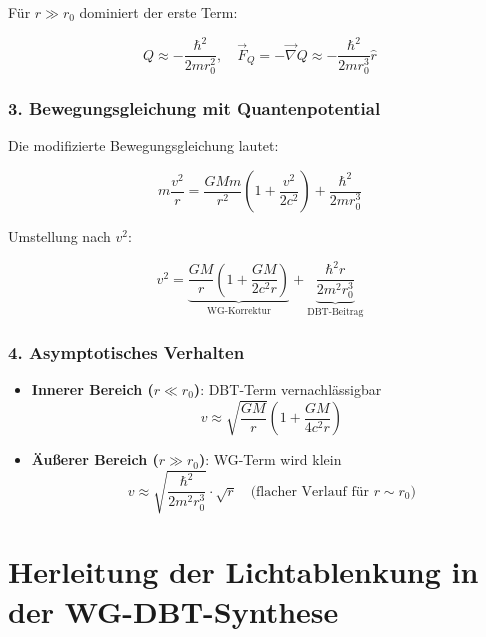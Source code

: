 Für $r \gg r_0$ dominiert der erste Term:

\begin{equation}
Q \approx -\frac{\hbar^2}{2m r_0^2}, \quad \vec{F}_Q = -\vec{\nabla}Q \approx -\frac{\hbar^2}{2m r_0^3}\hat{r}
\end{equation}

\subsubsection{3. Bewegungsgleichung mit Quantenpotential}
Die modifizierte Bewegungsgleichung lautet:

\begin{equation}
m\frac{v^2}{r} = \frac{GMm}{r^2}\left(1 + \frac{v^2}{2c^2}\right) + \frac{\hbar^2}{2m r_0^3}
\end{equation}

Umstellung nach $v^2$:

\begin{equation}
    \label{eq:rotationskurve}
    \boxed
    {
        v^2 = \underbrace{\frac{GM}{r}\left(1 + \frac{GM}{2c^2r}\right)}_{\text{WG-Korrektur}} + \underbrace{\frac{\hbar^2 r}{2m^2 r_0^3}}_{\text{DBT-Beitrag}}
    }
\end{equation}

\subsubsection{4. Asymptotisches Verhalten}
\begin{itemize}
\item \textbf{Innerer Bereich ($r \ll r_0$)}: DBT-Term vernachlässigbar
\begin{equation}
v \approx \sqrt{\frac{GM}{r}} \left(1 + \frac{GM}{4c^2r}\right)
\end{equation}

\item \textbf{Äußerer Bereich ($r \gg r_0$)}: WG-Term wird klein
\begin{equation}
v \approx \sqrt{\frac{\hbar^2}{2m^2 r_0^3}} \cdot \sqrt{r} \quad \text{(flacher Verlauf für $r \sim r_0$)}
\end{equation}
\end{itemize}

\section{Herleitung der Lichtablenkung in der WG-DBT-Synthese}
\label{sec:lichtablenkung}

